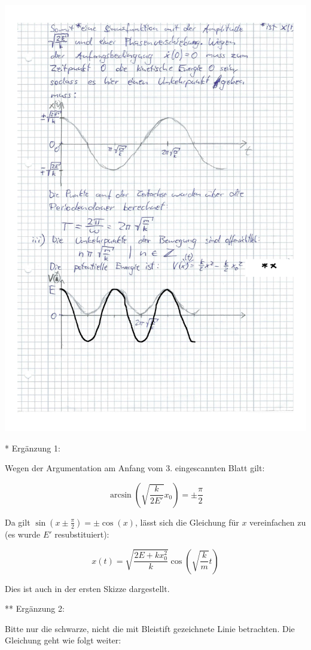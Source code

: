 \documentclass{theozettel}
\begin{document}
\begin{center}
\includegraphics[width=15cm]{A2-Teil3_annotated.pdf}
\end{center}

* Ergänzung 1:

Wegen der Argumentation am Anfang vom 3. eingescannten Blatt gilt:

$$
\arcsin(\sqrt{\frac{k}{2 E'}} x_0) = \pm \frac{\pi}{2}
$$

Da gilt $\sin(x \pm \frac{\pi}{2}) = \pm \cos(x)$, lässt sich die Gleichung für $x$ vereinfachen zu (es wurde $E'$ resubstituiert):

$$
x(t) = \sqrt{\frac{2 E + k x_0^{2}}{k}} \cos(\sqrt{\frac{k}{m}} t)
$$

Dies ist auch in der ersten Skizze dargestellt.


** Ergänzung 2:

Bitte nur die schwarze, nicht die mit Bleistift gezeichnete Linie betrachten. Die Gleichung geht wie folgt weiter:
\end{document}
